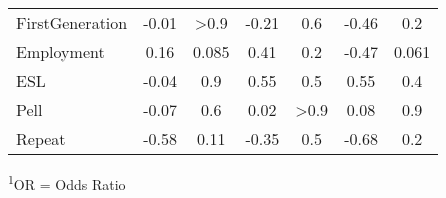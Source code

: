 \begin{appendix}
\begin{longtable}{lcccccc}
FirstGeneration & -0.01 & >0.9 & -0.21 & 0.6 & -0.46 & 0.2 \\ 
Employment & 0.16 & 0.085 & 0.41 & 0.2 & -0.47 & 0.061 \\ 
ESL & -0.04 & 0.9 & 0.55 & 0.5 & 0.55 & 0.4 \\ 
Pell & -0.07 & 0.6 & 0.02 & >0.9 & 0.08 & 0.9 \\ 
Repeat & -0.58 & 0.11 & -0.35 & 0.5 & -0.68 & 0.2 \\ 
\bottomrule
\end{longtable}
\begin{minipage}{\linewidth}
\textsuperscript{1}OR = Odds Ratio\\
\end{minipage}
\end{appendix}
